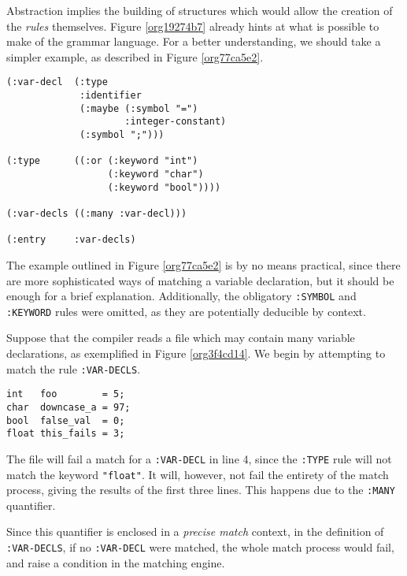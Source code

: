 \documentclass[a4paper,11pt,oneside]{article}
\begin{document}
Abstraction implies the building of structures which would allow the
creation of the \emph{rules} themselves. Figure \ref{org19274b7} already hints
at what is possible to make of the grammar language. For a better
understanding, we should take a simpler example, as described in
Figure \ref{org77ca5e2}.

\begin{verbatim}
(:var-decl  (:type
             :identifier
             (:maybe (:symbol "=")
                     :integer-constant)
             (:symbol ";")))

(:type      ((:or (:keyword "int")
                  (:keyword "char")
                  (:keyword "bool"))))

(:var-decls ((:many :var-decl)))

(:entry     :var-decls)
\end{verbatim}
\hfill \break

The example outlined in Figure \ref{org77ca5e2} is by no means
practical, since there are more sophisticated ways of matching a
variable declaration, but it should be enough for a brief
explanation. Additionally, the obligatory \texttt{:SYMBOL} and \texttt{:KEYWORD} rules
were omitted, as they are potentially deducible by context.

Suppose that the compiler reads a file which may contain many variable
declarations, as exemplified in Figure \ref{org3f4cd14}. We begin by
attempting to match the rule \texttt{:VAR-DECLS}.

\begin{verbatim}
int   foo        = 5;
char  downcase_a = 97;
bool  false_val  = 0;
float this_fails = 3;
\end{verbatim}
\hfill \break

The file will fail a match for a \texttt{:VAR-DECL} in line 4, since the \texttt{:TYPE}
rule will not match the keyword \texttt{"float"}. It will, however, not fail
the entirety of the match process, giving the results of the first
three lines. This happens due to the \texttt{:MANY} quantifier.

Since this quantifier is enclosed in a \emph{precise match} context, in the
definition of \texttt{:VAR-DECLS}, if no \texttt{:VAR-DECL} were matched, the whole
match process would fail, and raise a condition in the matching
engine.
\end{document}
